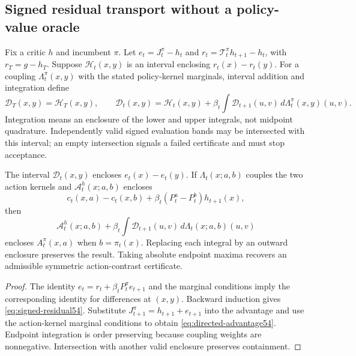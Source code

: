 \subsection{Signed residual transport without a policy-value oracle}
Fix a critic $h$ and incumbent $\pi$. Let $e_t=J_t^\pi-h_t$ and $r_t=\mathcal T_t^\pi h_{t+1}-h_t$, with $r_T=g-h_T$. Suppose $\mathcal H_t(x,y)$ is an interval enclosing $r_t(x)-r_t(y)$. For a coupling $\Lambda_t^\pi(x,y)$ with the stated policy-kernel marginals, interval addition and integration define
\begin{equation}\label{eq:signed-residual54}
 \mathcal D_T(x,y)=\mathcal H_T(x,y),\qquad
 \mathcal D_t(x,y)=\mathcal H_t(x,y)+\beta_t
          \int\mathcal D_{t+1}(u,v)\,d\Lambda_t^\pi(x,y)(u,v).
\end{equation}
Integration means an enclosure of the lower and upper integrals, not midpoint quadrature. Independently valid signed evaluation bands may be intersected with this interval; an empty intersection signals a failed certificate and must stop acceptance.

\begin{proposition}\label{prop:signed-residual54}
The interval $\mathcal D_t(x,y)$ encloses $e_t(x)-e_t(y)$. If $\Lambda_t(x;a,b)$ couples the two action kernels and $\mathcal A_t^h(x;a,b)$ encloses
\[
 c_t(x,a)-c_t(x,b)+\beta_t(P_t^a-P_t^b)h_{t+1}(x),
\]
then
\begin{equation}\label{eq:directed-advantage54}
 \mathcal A_t^h(x;a,b)+\beta_t
       \int\mathcal D_{t+1}(u,v)\,d\Lambda_t(x;a,b)(u,v)
\end{equation}
encloses $A_t^\pi(x,a)$ when $b=\pi_t(x)$. Replacing each integral by an outward enclosure preserves the result. Taking absolute endpoint maxima recovers an admissible symmetric action-contrast certificate.
\end{proposition}

\begin{proof}
The identity $e_t=r_t+\beta_tP_t^\pi e_{t+1}$ and the marginal conditions imply the corresponding identity for differences at $(x,y)$. Backward induction gives \eqref{eq:signed-residual54}. Substitute $J_{t+1}^\pi=h_{t+1}+e_{t+1}$ into the advantage and use the action-kernel marginal conditions to obtain \eqref{eq:directed-advantage54}. Endpoint integration is order preserving because coupling weights are nonnegative. Intersection with another valid enclosure preserves containment.
\end{proof}

